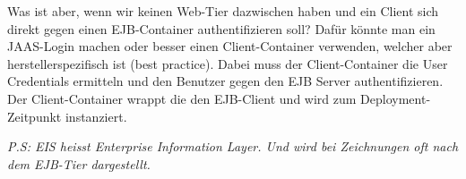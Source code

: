 Was ist aber, wenn wir keinen Web-Tier dazwischen haben und ein Client sich direkt gegen einen EJB-Container authentifizieren soll? Dafür könnte man ein JAAS-Login machen oder besser einen Client-Container verwenden, welcher aber herstellerspezifisch ist (best practice). Dabei muss der Client-Container die User Credentials ermitteln und den Benutzer gegen den EJB Server authentifizieren. Der Client-Container wrappt die den EJB-Client und wird zum Deployment-Zeitpunkt instanziert.

\emph{P.S: EIS heisst Enterprise Information Layer. Und wird bei Zeichnungen oft nach dem EJB-Tier dargestellt.} 